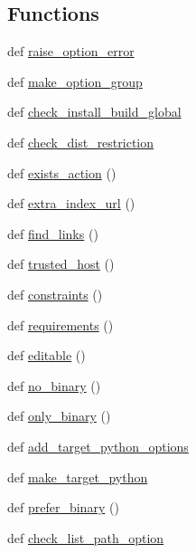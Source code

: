 \subsection*{Functions}
\begin{DoxyCompactItemize}
\item 
def \hyperlink{namespacepip_1_1__internal_1_1cli_1_1cmdoptions_a13124f60d6e91ffc8c04e860c85e1865}{raise\+\_\+option\+\_\+error}
\item 
def \hyperlink{namespacepip_1_1__internal_1_1cli_1_1cmdoptions_ab68c8a0374f17468ca7a89e4e2278207}{make\+\_\+option\+\_\+group}
\item 
def \hyperlink{namespacepip_1_1__internal_1_1cli_1_1cmdoptions_ab18ec6879429bb5b0f943bf15100dbec}{check\+\_\+install\+\_\+build\+\_\+global}
\item 
def \hyperlink{namespacepip_1_1__internal_1_1cli_1_1cmdoptions_a3085fdde429b762187382eba782d5b24}{check\+\_\+dist\+\_\+restriction}
\item 
def \hyperlink{namespacepip_1_1__internal_1_1cli_1_1cmdoptions_a270bc2eab0a184c79eb6609b6fc9c75a}{exists\+\_\+action} ()
\item 
def \hyperlink{namespacepip_1_1__internal_1_1cli_1_1cmdoptions_a04d64495effb51b936d4a4da0533249d}{extra\+\_\+index\+\_\+url} ()
\item 
def \hyperlink{namespacepip_1_1__internal_1_1cli_1_1cmdoptions_a9e0e720e5bade69893ed628a802f2428}{find\+\_\+links} ()
\item 
def \hyperlink{namespacepip_1_1__internal_1_1cli_1_1cmdoptions_a937f60d822d2243b02dcf5f8510401f0}{trusted\+\_\+host} ()
\item 
def \hyperlink{namespacepip_1_1__internal_1_1cli_1_1cmdoptions_ae7f9ecebcf1f89c1bfd22333499da6e2}{constraints} ()
\item 
def \hyperlink{namespacepip_1_1__internal_1_1cli_1_1cmdoptions_a611177b4be8bcd4384cfa1d3aad5f078}{requirements} ()
\item 
def \hyperlink{namespacepip_1_1__internal_1_1cli_1_1cmdoptions_aefac535fa110f26629e2add826324529}{editable} ()
\item 
def \hyperlink{namespacepip_1_1__internal_1_1cli_1_1cmdoptions_a7686192f1441195728bb354702c2c8ad}{no\+\_\+binary} ()
\item 
def \hyperlink{namespacepip_1_1__internal_1_1cli_1_1cmdoptions_a163f5aaf304a4cae5f0eb2f8eb3b4435}{only\+\_\+binary} ()
\item 
def \hyperlink{namespacepip_1_1__internal_1_1cli_1_1cmdoptions_ad57144ab587a6d6c283cbd69d8823be9}{add\+\_\+target\+\_\+python\+\_\+options}
\item 
def \hyperlink{namespacepip_1_1__internal_1_1cli_1_1cmdoptions_a0923ea27232a8c31017dd86ef4a4aea3}{make\+\_\+target\+\_\+python}
\item 
def \hyperlink{namespacepip_1_1__internal_1_1cli_1_1cmdoptions_aa069bf43d3a501305bbbaeee0af42c9e}{prefer\+\_\+binary} ()
\item 
def \hyperlink{namespacepip_1_1__internal_1_1cli_1_1cmdoptions_a1b4c5c4ae86410e3489a4509229ae6da}{check\+\_\+list\+\_\+path\+\_\+option}
\end{DoxyCompactItemize}


